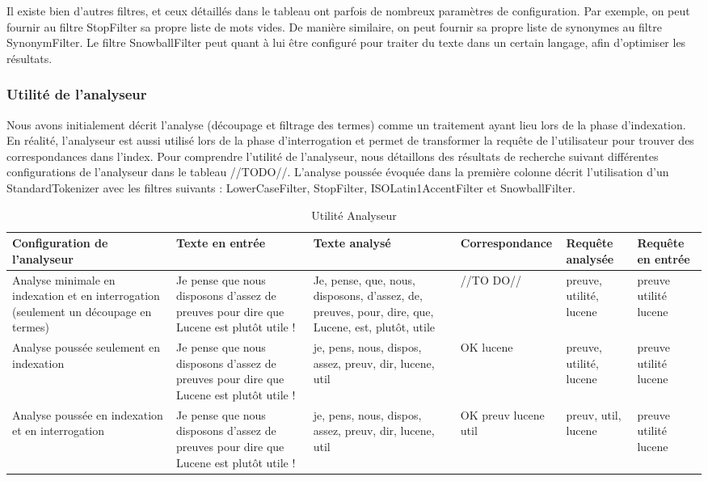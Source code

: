 Il existe bien d’autres filtres, et ceux détaillés dans le tableau ont parfois de nombreux paramètres de configuration. Par exemple, on peut fournir au filtre StopFilter sa propre liste de mots vides. De manière similaire, on peut fournir sa propre liste de synonymes au filtre SynonymFilter. Le filtre SnowballFilter peut quant à lui être configuré pour traiter du texte dans un certain langage, afin d’optimiser les résultats.

\subsubsection{Utilité de l'analyseur}

Nous avons initialement décrit l’analyse (découpage et filtrage des termes) comme un traitement ayant lieu lors de la phase d’indexation. En réalité, l’analyseur est aussi utilisé lors de la phase d’interrogation et permet de transformer la requête de l’utilisateur pour trouver des correspondances dans l’index. Pour comprendre l’utilité de l’analyseur, nous détaillons des résultats de recherche suivant différentes configurations de l’analyseur dans le tableau //TODO//. L’analyse poussée évoquée dans la première colonne décrit l’utilisation d’un StandardTokenizer avec les filtres suivants : LowerCaseFilter, StopFilter, ISOLatin1AccentFilter et SnowballFilter.

\begin{table}[!htbp]
    \hspace{-3cm}
                \begin{tabular}{|p{3cm}|p{3cm}|p{3cm}|p{3cm}|p{3cm}|p{3cm}|}
                    \hline
                    \textbf{Configuration de l’analyseur} & \textbf{Texte en entrée} & \textbf{Texte analysé} & \textbf{Correspondance} & \textbf{Requête analysée} & \textbf{Requête en entrée}\\
                    \hline                    
Analyse minimale en indexation et en interrogation (seulement un découpage en termes) & Je pense que nous disposons d’assez de preuves pour dire que Lucene est plutôt utile ! & Je, pense, que, nous, disposons, d’assez, de, preuves, pour, dire, que, Lucene, est, plutôt, utile & //TO DO// & preuve, utilité, lucene & preuve utilité lucene\\
		\hline
Analyse poussée seulement en indexation & Je pense que nous disposons d’assez de preuves pour dire que Lucene est plutôt utile ! & je, pens, nous, dispos, assez, preuv, dir, lucene, util & OK lucene & preuve, utilité, lucene & preuve utilité lucene\\
		\hline
Analyse poussée en indexation et en interrogation & Je pense que nous disposons d’assez de preuves pour dire que Lucene est plutôt utile ! & je, pens, nous, dispos, assez, preuv, dir, lucene, util & OK preuv lucene util & preuv, util, lucene & preuve utilité lucene\\
                    \hline

                \end{tabular}
                \caption{Utilité Analyseur}
                \label{tab:utilité_analyseur}
            \end{table}


